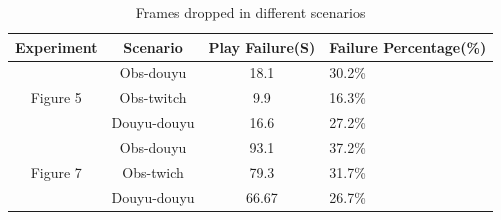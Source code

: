 \begin{table}[tb]
\centering
\caption{Frames dropped in different scenarios}
\label{tbl:drop}
{\setlength{\tabcolsep}{1pt}
\begin{tabular}{|c|c|c|l|}
\hline
\textbf{Experiment} & \textbf{Scenario} & \textbf{Play Failure(S)} & \textbf{ Failure Percentage(\%)}   \\ \hline
\multirow{3}{*}{Figure 5}&  Obs-douyu               & 18.1         & 30.2\%                           \\ \cline{2-4}
& Obs-twitch              & 9.9        & 16.3\%    \\ \cline{2-4}
& Douyu-douyu            & 16.6      & 27.2\% \\ \hline
\multirow{4}{*}{Figure 7} & Obs-douyu            & 93.1      & 37.2\%     \\ \cline{2-4}
& Obs-twich             & 79.3      & 31.7\%  \\ \cline{2-4}
& Douyu-douyu             & 66.67         & 26.7\%  \\ \hline
\end{tabular}}
\vspace{-0.2in}
\end{table} 